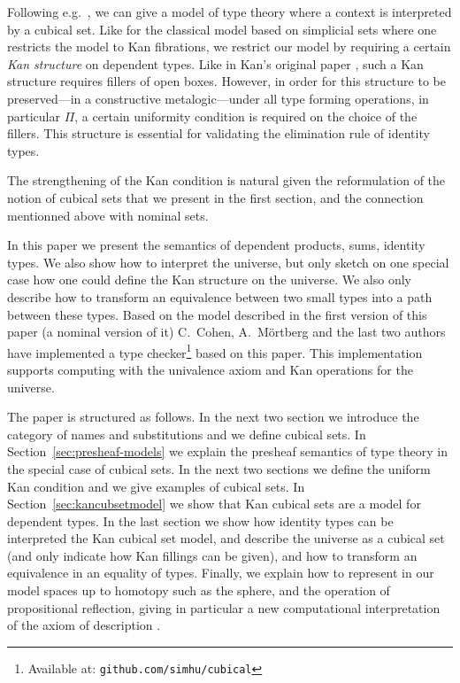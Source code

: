 \documentclass[10pt,a4paper]{article}
\begin{document}
 Following e.g.\ \cite{Hofmann}, we can give a model of type theory
where a context is interpreted by a cubical set.
Like for the classical model based on simplicial sets
where one restricts the model to Kan fibrations, we restrict our model
by requiring a certain \emph{Kan structure} on dependent types.  Like
in Kan's original paper \cite{Kan}, such
a Kan structure requires fillers of open boxes.  However, in order for this
structure to be preserved---in a constructive metalogic---under all
type forming operations, in particular $\Pi$, a certain uniformity
condition is required on the choice of the fillers. This structure is
essential for validating the elimination rule of identity types.

 The strengthening of the Kan condition is natural given the
reformulation of the notion of cubical sets that we present in the
first section, and the connection mentionned above with nominal sets.


In this paper we present the semantics of dependent products, sums, 
identity types. We also show how to interpret the universe, but only
sketch on one special case how one could define the Kan structure on
the universe. We also only describe how to transform an equivalence
between two small types into a path between these types.
Based on the model described in the first version of this paper (a nominal version of it)
C.~Cohen, A.~M\"ortberg and the last two authors have implemented a
type checker\footnote{Available at: {\tt github.com/simhu/cubical}}
based on this paper.  This implementation supports computing with the
univalence axiom and Kan operations for the universe.

The paper is structured as follows. In the next two section we
introduce the category of names and substitutions and we define
cubical sets.  In Section~\ref{sec:presheaf-models} we explain the
presheaf semantics of type theory in the special case of cubical
sets. In the next two sections we define the uniform Kan condition and
we give examples of cubical sets.  In Section~\ref{sec:kancubsetmodel}
we show that Kan cubical sets are a model for dependent types.  In the
last section we show how identity types can be interpreted the Kan
cubical set model, and describe the universe as a cubical set (and
only indicate how Kan fillings can be given), and how to transform an
equivalence in an equality of types.  Finally, we explain how to
represent in our model spaces up to homotopy such as the sphere, and
the operation of propositional reflection, giving in particular a new
computational interpretation of the axiom of description
\cite{Russell}.
\end{document}
